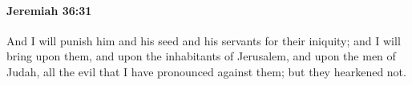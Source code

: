 
		\paragraph{Jeremiah 36:31} %
			\label{JEREMIAH-36-31}

			And I will punish him and his seed and his servants for their iniquity; and I will bring upon them, and upon the inhabitants of Jerusalem, and upon the men of Judah, all the evil that I have pronounced against them; but they hearkened not.


